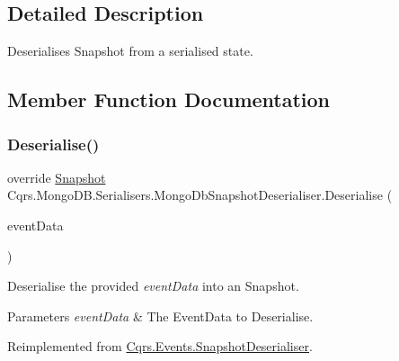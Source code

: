 \subsection{Detailed Description}
Deserialises Snapshot from a serialised state. 



\subsection{Member Function Documentation}
\mbox{\label{classCqrs_1_1MongoDB_1_1Serialisers_1_1MongoDbSnapshotDeserialiser_ad7963b969a1edd5451605887933c0c89_ad7963b969a1edd5451605887933c0c89}} 
\subsubsection{\texorpdfstring{Deserialise()}{Deserialise()}}
{\footnotesize\ttfamily override \hyperlink{classCqrs_1_1Snapshots_1_1Snapshot}{Snapshot} Cqrs.\+Mongo\+D\+B.\+Serialisers.\+Mongo\+Db\+Snapshot\+Deserialiser.\+Deserialise (\begin{DoxyParamCaption}\item[{\hyperlink{classCqrs_1_1Events_1_1EventData}{Event\+Data}}]{event\+Data }\end{DoxyParamCaption})\hspace{0.3cm}{\ttfamily [virtual]}}



Deserialise the provided {\itshape event\+Data}  into an Snapshot. 


\begin{DoxyParams}{Parameters}
{\em event\+Data} & The Event\+Data to Deserialise.\\
\hline
\end{DoxyParams}


Reimplemented from \hyperlink{classCqrs_1_1Events_1_1SnapshotDeserialiser_a0c2b0f71dd0aad4d4b65d847a6e50902_a0c2b0f71dd0aad4d4b65d847a6e50902}{Cqrs.\+Events.\+Snapshot\+Deserialiser}.

